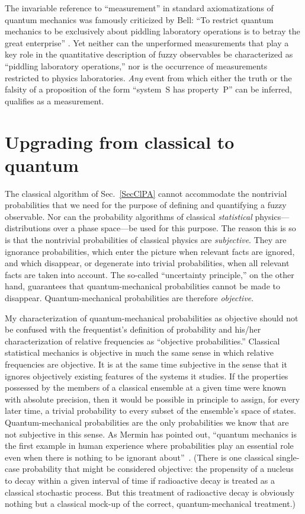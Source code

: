 \documentclass[12pt]{article}
\begin{document}
The invariable reference to ``measurement'' in standard axiomatizations of quantum mechanics was famously criticized by Bell: ``To restrict quantum mechanics to be exclusively about piddling laboratory operations is to betray the great enterprise'' \cite{Bell}. Yet neither can the unperformed measurements that play a key role in the quantitative description of fuzzy observables be characterized as ``piddling laboratory operations,'' nor is the occurrence of measurements restricted to physics laboratories. \textit{Any} event from which either the truth or the falsity of a proposition of the form ``system~S has property~P'' can be inferred, qualifies as a measurement.

\section{Upgrading from classical to quantum}
\label{SecUpgrade}The classical algorithm of Sec.~\ref{SecClPA} cannot accommodate the nontrivial probabilities that we need for the purpose of defining and quantifying a fuzzy observable. Nor can the probability algorithms of classical \textit{statistical} physics---distributions over a phase space---be used for this purpose. The reason this is so is that the nontrivial probabilities of classical physics are  \textit{subjective}. They are ignorance probabilities, which enter the picture when relevant facts are ignored, and which disappear, or degenerate into trivial probabilities, when all relevant facts are taken into account. The so-called ``uncertainty principle,'' on the other hand, guarantees that quantum-mechanical probabilities cannot be made to disappear. Quantum-mechanical probabilities are therefore \textit{objective}.

My characterization of quantum-mechanical probabilities as objective should not be confused with the frequentist's definition of probability and his/her characterization of relative frequencies as ``objective probabilities.'' Classical statistical mechanics is objective in much the same sense in which relative frequencies are objective. It is at the same time subjective in the sense that it ignores objectively existing features of the systems it studies. If the properties possessed by the members of a classical ensemble at a given time were known with absolute precision, then it would be possible in principle to assign, for every later time, a trivial probability to every subset of the ensemble's space of states. Quantum-mechanical probabilities are the only probabilities we know that are not subjective in this sense. As Mermin has pointed out, ``quantum mechanics is the first example in human experience where probabilities play an essential role even when there is nothing to be ignorant about''~\cite{Mermin}. (There is one classical single-case probability that might be considered objective: the propensity of a nucleus to decay within a given interval of time if radioactive decay is treated as a classical stochastic process. But this treatment of radioactive decay is obviously nothing but a classical mock-up of the correct, quantum-mechanical treatment.)
\end{document}
